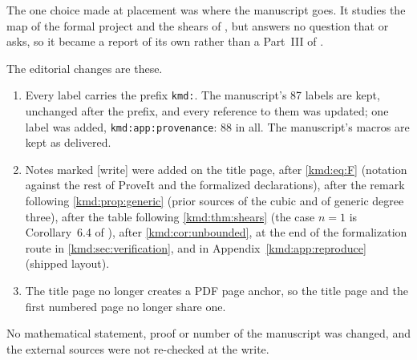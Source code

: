 \documentclass[11pt,a4paper]{article}
\numberwithin{equation}{section}
\theoremstyle{definition}
\theoremstyle{remark}
\newcommand{\wtag}{\textup{[write]}}%
\begin{document}
The one choice made at placement was where the manuscript goes. It
studies the map of the formal project and the shears of
\cite{weighted}, but answers no question that \cite{weighted} or
\cite{arithmetic} asks, so it became a report of its own rather than a
Part~III of \cite{weighted}.

The editorial changes are these.
\begin{enumerate}[label=(\arabic*)]
\item Every label carries the prefix \texttt{kmd:}. The manuscript's 87
labels are kept, unchanged after the prefix, and every reference to them
was updated; one label was added, \texttt{kmd:app:provenance}: 88 in
all. The manuscript's macros are kept as delivered.
\item Notes marked \wtag{} were added on the title page, after
\eqref{kmd:eq:F} (notation against the rest of ProveIt and the formalized
declarations), after the remark following \cref{kmd:prop:generic} (prior
sources of the cubic and of generic degree three), after the table
following \cref{kmd:thm:shears} (the case $n=1$ is Corollary~6.4 of
\cite{weighted}), after \cref{kmd:cor:unbounded}, at the end of the
formalization route in \cref{kmd:sec:verification}, and in
Appendix~\ref{kmd:app:reproduce} (shipped layout).
\item The title page no longer creates a PDF page anchor, so the
title page and the first numbered page no longer share one.
\end{enumerate}
No mathematical statement, proof or number of the manuscript was
changed, and the external sources \cite{giannini,gao,audit} were not
re-checked at the write.
\end{document}
